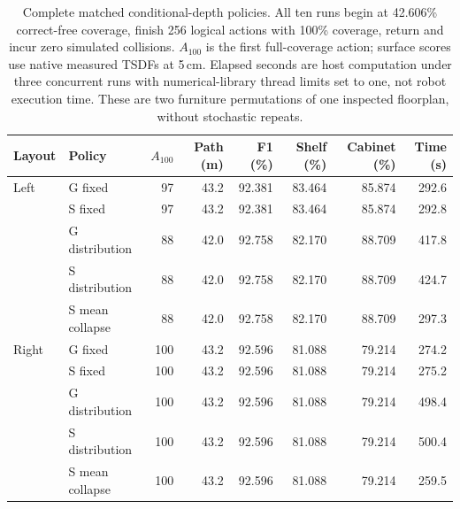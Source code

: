 \begin{table}[H]
\centering\small
\setlength{\tabcolsep}{3.5pt}
\caption{Complete matched conditional-depth policies. All ten runs begin at 42.606\% correct-free coverage, finish 256 logical actions with 100\% coverage, return and incur zero simulated collisions. $A_{100}$ is the first full-coverage action; surface scores use native measured TSDFs at 5\,cm. Elapsed seconds are host computation under three concurrent runs with numerical-library thread limits set to one, not robot execution time. These are two furniture permutations of one inspected floorplan, without stochastic repeats.}
\label{tab:joint-depth-policy}
\begin{tabular}{llrrrrrr}
\toprule
Layout & Policy & $A_{100}$ & Path (m) & F1 (\%) & Shelf (\%) & Cabinet (\%) & Time (s) \\
\midrule
Left & G fixed & 97 & 43.2 & 92.381 & 83.464 & 85.874 & 292.6 \\
 & S fixed & 97 & 43.2 & 92.381 & 83.464 & 85.874 & 292.8 \\
 & G distribution & 88 & 42.0 & 92.758 & 82.170 & 88.709 & 417.8 \\
 & S distribution & 88 & 42.0 & 92.758 & 82.170 & 88.709 & 424.7 \\
 & S mean collapse & 88 & 42.0 & 92.758 & 82.170 & 88.709 & 297.3 \\
\midrule
Right & G fixed & 100 & 43.2 & 92.596 & 81.088 & 79.214 & 274.2 \\
 & S fixed & 100 & 43.2 & 92.596 & 81.088 & 79.214 & 275.2 \\
 & G distribution & 100 & 43.2 & 92.596 & 81.088 & 79.214 & 498.4 \\
 & S distribution & 100 & 43.2 & 92.596 & 81.088 & 79.214 & 500.4 \\
 & S mean collapse & 100 & 43.2 & 92.596 & 81.088 & 79.214 & 259.5 \\
\bottomrule
\end{tabular}
\end{table}
